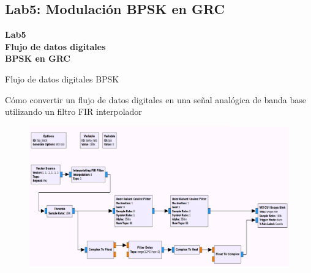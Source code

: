 \subsection{Lab5: Modulación BPSK en GRC}

\begin{frame}{}


\bfseries{\textrm{\LARGE Lab5\\ \Large Flujo de datos digitales\\BPSK en GRC}}
\raggedright
\end{frame}

\begin{frame}{Flujo de datos digitales BPSK}


\justifying
Cómo convertir un flujo de datos digitales en una señal analógica de banda base utilizando un filtro FIR interpolador
\\
\begin{figure}
\includegraphics[width=.9\textwidth]{parte1/lab5/pdf/lab5_1.pdf}
\end{figure}
\end{frame}

